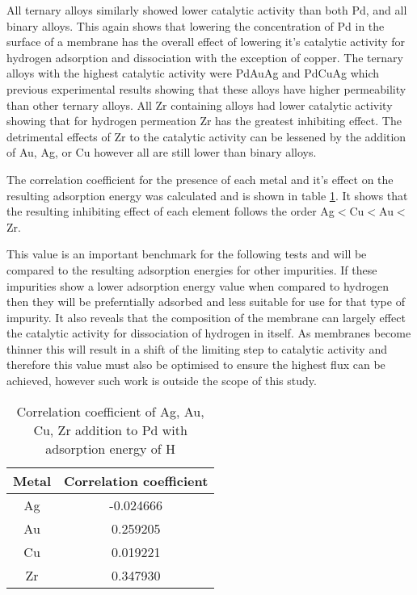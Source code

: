 All ternary alloys similarly showed lower catalytic activity than both Pd, and all binary alloys. This again shows that lowering the concentration of Pd in the surface of a membrane has the overall effect of lowering it's catalytic activity for hydrogen adsorption and dissociation with the exception of copper. The ternary alloys with the highest catalytic activity were PdAuAg and PdCuAg which previous experimental results showing that these alloys have higher permeability than other ternary alloys. All Zr containing alloys had lower catalytic activity showing that for hydrogen permeation Zr has the greatest inhibiting effect. The detrimental effects of Zr to the catalytic activity can be lessened by the addition of Au, Ag, or Cu however all are still lower than binary alloys. 

The correlation coefficient for the presence of each metal and it's effect on the resulting adsorption energy was calculated and is shown in table \ref{corrH}. It shows that the resulting inhibiting effect of each element follows the order Ag$<$Cu$<$Au$<$Zr. 

This value is an important benchmark for the following tests and will be compared to the resulting adsorption energies for other impurities. If these impurities show a lower adsorption energy value when compared to hydrogen then they will be preferntially adsorbed and less suitable for use for that type of impurity. It also reveals that the composition of the membrane can largely effect the catalytic activity for dissociation of hydrogen in itself. As membranes become thinner this will result in a shift of the limiting step to catalytic activity and therefore this value must also be optimised to ensure the highest flux can be achieved, however such work is outside the scope of this study. 

\begin{table}[]
  \centering
  \caption{Correlation coefficient of Ag, Au, Cu, Zr addition to Pd with adsorption energy of H}
  \label{corrH}
  \begin{tabular}{@{}cc@{}}
  \toprule
  Metal & Correlation coefficient \\ \midrule
  Ag    & -0.024666               \\
  Au    & 0.259205                \\
  Cu    & 0.019221                \\
  Zr    & 0.347930                \\ \bottomrule
  \end{tabular}
  \end{table}




